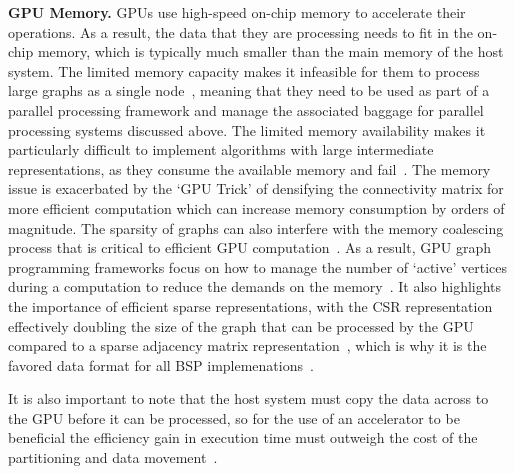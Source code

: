 \textbf{GPU Memory.}
GPUs use high-speed on-chip memory to accelerate their operations. 
As a result, the data that they are processing needs to fit in the on-chip memory, which is typically much smaller than the main memory of the host system. 
The limited memory capacity makes it infeasible for them to process large graphs as a single node~\cite{Aananthakrishnan2020}, meaning that they need to be used as part of a parallel processing framework and manage the associated baggage for parallel processing systems discussed above.
The limited memory availability makes it particularly difficult to implement algorithms with large intermediate representations, as they consume the available memory and fail~\cite{Sundaram2015}.
The memory issue is exacerbated by the `GPU Trick' of densifying the connectivity matrix for more efficient computation which can increase memory consumption by orders of magnitude. 
The sparsity of graphs can also interfere with the memory coalescing process that is critical to efficient GPU computation~\cite{Aananthakrishnan2020}.
As a result, GPU graph programming frameworks focus on how to manage the number of `active' vertices during a computation to reduce the demands on the memory~\cite{Wang2016}.
It also highlights the importance of efficient sparse representations, with the CSR representation effectively doubling the size of the graph that can be processed by the GPU compared to a sparse adjacency matrix representation~\cite{Liu2014}, which is why it is the favored data format for all BSP implemenations~\cite{Wu2015}.

It is also important to note that the host system must copy the data across to the GPU before it can be processed, so for the use of an accelerator to be beneficial the efficiency gain in execution time must outweigh the cost of the partitioning and data movement~\cite{Azad2021}.

